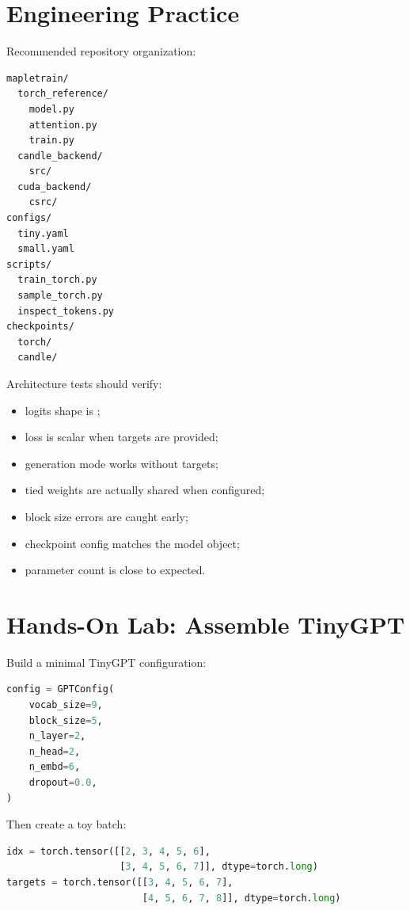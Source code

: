 \section{Engineering Practice}

Recommended repository organization:

\begin{lstlisting}
mapletrain/
  torch_reference/
    model.py
    attention.py
    train.py
  candle_backend/
    src/
  cuda_backend/
    csrc/
configs/
  tiny.yaml
  small.yaml
scripts/
  train_torch.py
  sample_torch.py
  inspect_tokens.py
checkpoints/
  torch/
  candle/
\end{lstlisting}

Architecture tests should verify:

\begin{itemize}
  \item logits shape is \shape{[B,T,V]};
  \item loss is scalar when targets are provided;
  \item generation mode works without targets;
  \item tied weights are actually shared when configured;
  \item block size errors are caught early;
  \item checkpoint config matches the model object;
  \item parameter count is close to expected.
\end{itemize}

\section{Hands-On Lab: Assemble TinyGPT}

Build a minimal TinyGPT configuration:

\begin{lstlisting}[language=Python]
config = GPTConfig(
    vocab_size=9,
    block_size=5,
    n_layer=2,
    n_head=2,
    n_embd=6,
    dropout=0.0,
)
\end{lstlisting}

Then create a toy batch:

\begin{lstlisting}[language=Python]
idx = torch.tensor([[2, 3, 4, 5, 6],
                    [3, 4, 5, 6, 7]], dtype=torch.long)
targets = torch.tensor([[3, 4, 5, 6, 7],
                        [4, 5, 6, 7, 8]], dtype=torch.long)
\end{lstlisting}

